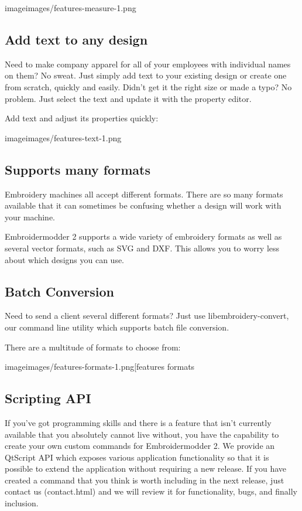 image{images/features-measure-1.png}

\subsection{Add text to any design}

Need to make company apparel for all of your employees with individual names on them? No sweat.
Just simply add text to your existing design or create one from scratch, quickly and easily.
Didn't get it the right size or made a typo? No problem. Just select the text and update it
with the property editor.

Add text and adjust its properties quickly:

image{images/features-text-1.png}

\subsection{Supports many formats}

Embroidery machines all accept different formats. There are so many formats
available that it can sometimes be confusing whether a design will work with your machine.

Embroidermodder 2 supports a wide variety of embroidery formats as well as several vector
formats, such as SVG and DXF. This allows you to worry less about which designs you can use.

\subsection{Batch Conversion}

Need to send a client several different formats? Just use libembroidery-convert, our command
line utility which supports batch file conversion.

There are a multitude of formats to choose from:

image{images/features-formats-1.png[features formats}

\subsection{Scripting API}

If you've got programming skills and there is a feature that isn't currently available that you
absolutely cannot live without, you have the capability to create your own custom commands for
Embroidermodder 2. We provide an QtScript API which exposes various application functionality
so that it is possible to extend the application without requiring a new release. If you have
created a command that you think is worth including in the next release, just  contact
us (contact.html) and we will review it for functionality, bugs, and finally inclusion.

